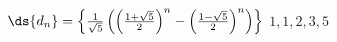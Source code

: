 {$\ds \{d_n\} = \left\{\frac{1}{\sqrt{5}}\left(\left(\frac{1+\sqrt{5}}{2}\right)^n-\left(\frac{1-\sqrt{5}}{2}\right)^n\right)\right\}$
}
{$1, 1, 2, 3, 5$
}

